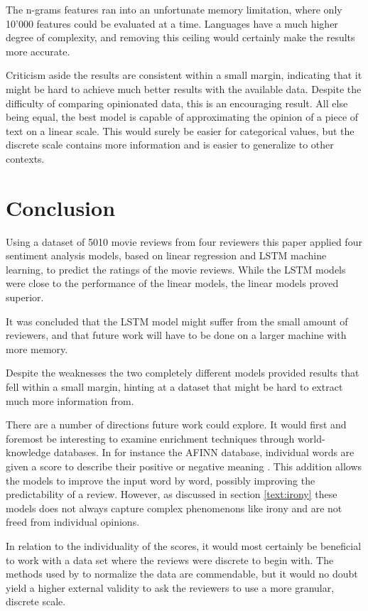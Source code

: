 \documentclass[a4paper]{article}
\begin{document}
The n-grams features ran into an unfortunate memory limitation, where only
10'000 features could be evaluated at a time. Languages have a much higher
degree of complexity, and removing this ceiling would certainly make the results
more accurate.
\vskip10pt

Criticism aside the results are consistent within a small margin, indicating
that it might be hard to achieve much better results with the available data.
Despite the difficulty of comparing opinionated data, this is an encouraging
result. All else being equal, the best model is capable of approximating
the opinion of a piece of text on a linear scale. This would surely be easier
for categorical values, but the discrete scale contains more information and
is easier to generalize to other contexts.

\section{Conclusion}
Using a dataset of 5010 movie reviews from four reviewers this paper applied
four sentiment analysis models, based on linear regression and LSTM
machine learning, to predict the ratings of the movie reviews.
While the LSTM models were close to the performance of the linear models,
the linear models proved superior.

It was concluded that the LSTM model might suffer from the small amount of
reviewers, and that future work will have to be done on a larger machine with
more memory.

Despite the weaknesses the two completely different models provided results
that fell within a small margin, hinting at a dataset that might be hard to
extract much more information from.

There are a number of directions future work could explore. It would first and
foremost be interesting to examine enrichment techniques through world-knowledge
databases. In for instance the AFINN database, individual words are given a
score to describe their positive or negative meaning \citep{IMM2011-06010}.
This addition allows the models to improve the input word by word, possibly
improving the predictability of a review. However, as discussed in section
\ref{text:irony} these models does not always capture complex phenomenons like
irony and are not freed from individual opinions.

In relation to the individuality of the scores, it would most certainly be
beneficial to work with a data set where the reviews were discrete to begin
with. The methods used by \cite{PangLee2005} to normalize the data are
commendable, but it would no doubt yield a higher external validity to ask
the reviewers to use a more granular, discrete scale.
\end{document}

